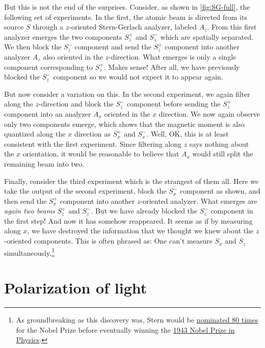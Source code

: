 But this is not the end of the surprises. 
Consider, as shown in \autoref{fig:SG-full}, the following set of experiments. 
In the first, the atomic beam is directed from its source $S$ through a $z$-oriented Stern-Gerlach analyzer, labeled $A_z$. 
From this first analyzer emerges the two components $S_z^+$ and $S_z^-$ which are spatially separated. 
We then block the $S_z^-$ component and send the $S_z^+$ component into another analyzer $A_z$ also oriented in the $z$-direction. 
What emerges is only a single component corresponding to $S_z^+$. 
Makes sense! 
After all, we have previously blocked the $S_z^-$ component so we would not expect it to appear again.

But now consider a variation on this. 
In the second experiment, we again filter along the $z$-direction and block the $S_z^-$ component before sending the $S_z^+$ component into an analyzer $A_x$ oriented in the $x$ direction. 
We now again observe only two components emerge, which shows that the magnetic moment is also quantized along the $x$ direction as $S_x^+$ and $S_x^-$. 
Well, OK, this is at least consistent with the first experiment. 
Since filtering along $z$ says nothing about the $x$ orientation, it would be reasonable to believe that $A_x$ would still split the remaining beam into two. 

Finally, consider the third experiment which is the strangest of them all. 
Here we take the output of the second experiment, block the $S_x^-$ component as shown, and then send the $S_x^+$ component into another $z$-oriented analyzer. 
What emerges are \emph{again two beams} $S_z^+$ and $S_z^-$. 
But we have already blocked the $S_z^-$ component in the first step! 
And now it has somehow reappeared. 
It seems as if by measuring along $x$, we have destroyed the information that we thought we knew about the $z$-oriented components. 
This is often phrased as: One can't measure $S_x$ and $S_z$ simultaneously.\footnote{As groundbreaking as this discovery was, Stern would be \href{https://www.nobelprize.org/prizes/physics/1943/stern/nominations/}{nominated 80 times} for the Nobel Prize before eventually winning the \href{https://www.nobelprize.org/prizes/physics/1943/summary/}{1943 Nobel Prize in Physics}.}



\section{Polarization of light}

